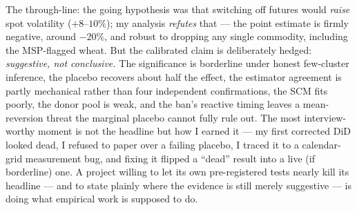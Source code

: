 \documentclass[11pt]{article}
\begin{document}
The through-line: the going hypothesis was that switching off futures would \emph{raise} spot
volatility ($+8$--$10\%$); my analysis \emph{refutes} that --- the point estimate is firmly
negative, around $-20\%$, and robust to dropping any single commodity, including the MSP-flagged
wheat. But the calibrated claim is deliberately hedged: \emph{suggestive, not conclusive.} The
significance is borderline under honest few-cluster inference, the placebo recovers about half the
effect, the estimator agreement is partly mechanical rather than four independent confirmations, the
SCM fits poorly, the donor pool is weak, and the ban's reactive timing leaves a mean-reversion threat
the marginal placebo cannot fully rule out. The most interview-worthy moment is not the headline but
how I earned it --- my first corrected DiD looked dead, I refused to paper over a failing placebo, I
traced it to a calendar-grid measurement bug, and fixing it flipped a ``dead'' result into a live (if
borderline) one. A project willing to let its own pre-registered tests nearly kill its headline ---
and to state plainly where the evidence is still merely suggestive --- is doing what empirical work
is supposed to do.
\end{document}
